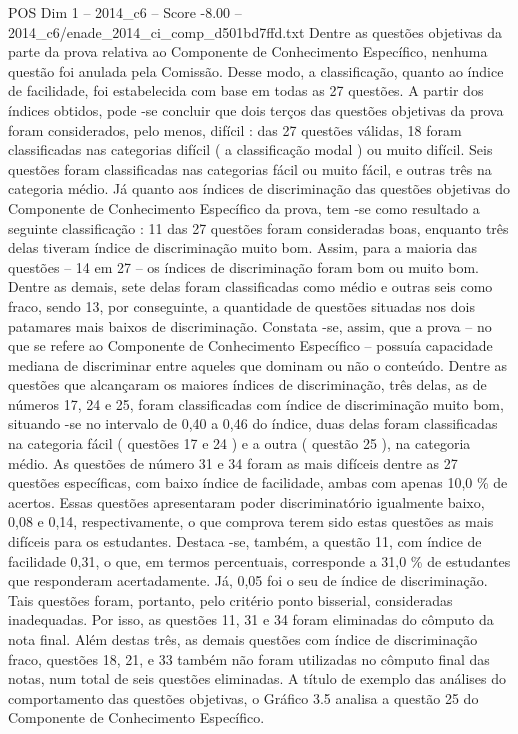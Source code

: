 \begin{textsample}{POS Dim 1 – 2014\_c6 – Score -8.00 – 2014\_c6/enade\_2014\_ci\_comp\_d501bd7ffd.txt}
Dentre as questões objetivas da parte da prova relativa ao Componente de Conhecimento Específico, nenhuma questão foi anulada pela Comissão.
Desse modo, a classificação, quanto ao índice de facilidade, foi estabelecida com base em todas as 27 questões.
A partir dos índices obtidos, pode -se concluir que dois terços das questões objetivas da prova foram considerados, pelo menos, difícil : das 27 questões válidas, 18 foram classificadas nas categorias difícil ( a classificação modal ) ou muito difícil.
Seis questões foram classificadas nas categorias fácil ou muito fácil, e outras três na categoria médio.
Já quanto aos índices de discriminação das questões objetivas do Componente de Conhecimento Específico da prova, tem -se como resultado a seguinte classificação : 11 das 27 questões foram consideradas boas, enquanto três delas tiveram índice de discriminação muito bom.
Assim, para a maioria das questões – 14 em 27 – os índices de discriminação foram bom ou muito bom.
Dentre as demais, sete delas foram classificadas como médio e outras seis como fraco, sendo 13, por conseguinte, a quantidade de questões situadas nos dois patamares mais baixos de discriminação.
Constata -se, assim, que a prova – no que se refere ao Componente de Conhecimento Específico – possuía capacidade mediana de discriminar entre aqueles que dominam ou não o conteúdo.
Dentre as questões que alcançaram os maiores índices de discriminação, três delas, as de números 17, 24 e 25, foram classificadas com índice de discriminação muito bom, situando -se no intervalo de 0,40 a 0,46 do índice, duas delas foram classificadas na categoria fácil ( questões 17 e 24 ) e a outra ( questão 25 ), na categoria médio.
As questões de número 31 e 34 foram as mais difíceis dentre as 27 questões específicas, com baixo índice de facilidade, ambas com apenas 10,0 \% de acertos.
Essas questões apresentaram poder discriminatório igualmente baixo, 0,08 e 0,14, respectivamente, o que comprova terem sido estas questões as mais difíceis para os estudantes.
Destaca -se, também, a questão 11, com índice de facilidade 0,31, o que, em termos percentuais, corresponde a 31,0 \% de estudantes que responderam acertadamente.
Já, 0,05 foi o seu de índice de discriminação.
Tais questões foram, portanto, pelo critério ponto bisserial, consideradas inadequadas.
Por isso, as questões 11, 31 e 34 foram eliminadas do cômputo da nota final.
Além destas três, as demais questões com índice de discriminação fraco, questões 18, 21, e 33 também não foram utilizadas no cômputo final das notas, num total de seis questões eliminadas.
A título de exemplo das análises do comportamento das questões objetivas, o Gráfico 3.5 analisa a questão 25 do Componente de Conhecimento Específico.

\end{textsample}
